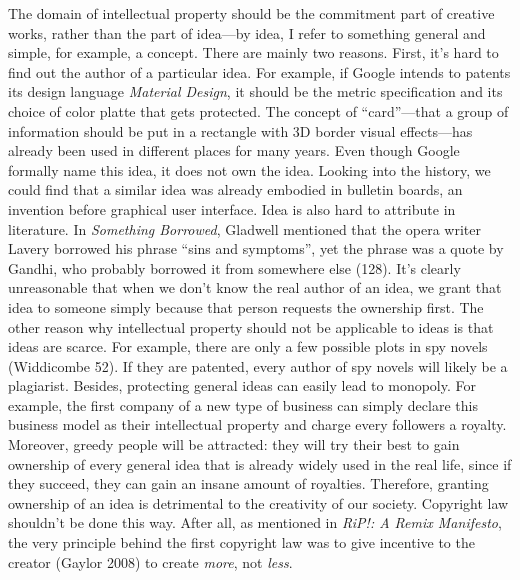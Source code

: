 \documentclass{writing}
\begin{document}
The domain of intellectual property should be the commitment part of
creative works, rather than the part of idea---by idea, I refer to
something general and simple, for example, a concept. There are mainly
two reasons. First, it's hard to find out the author of a particular
idea. For example, if Google intends to patents its design language
\emph{Material Design}, it should be the metric specification and its
choice of color platte that gets protected. The concept of
``card''---that a group of information should be put in a rectangle with
3D border visual effects---has already been used in different places for
many years. Even though Google formally name this idea, it does not own
the idea. Looking into the history, we could find that a similar idea
was already embodied in bulletin boards, an invention before graphical
user interface. Idea is also hard to attribute in literature. In
\emph{Something Borrowed}, Gladwell mentioned that the opera writer
Lavery borrowed his phrase ``sins and symptoms'', yet the phrase was a
quote by Gandhi, who probably borrowed it from somewhere else (128).
It's clearly unreasonable that when we don't know the real author of an
idea, we grant that idea to someone simply because that person requests
the ownership first. The other reason why intellectual property should
not be applicable to ideas is that ideas are scarce. For example, there
are only a few possible plots in spy novels (Widdicombe 52). If they are
patented, every author of spy novels will likely be a plagiarist.
Besides, protecting general ideas can easily lead to monopoly. For
example, the first company of a new type of business can simply declare
this business model as their intellectual property and charge every
followers a royalty. Moreover, greedy people will be attracted: they
will try their best to gain ownership of every general idea that is
already widely used in the real life, since if they succeed, they can
gain an insane amount of royalties. Therefore, granting ownership of an
idea is detrimental to the creativity of our society. Copyright law
shouldn't be done this way. After all, as mentioned in \emph{RiP!: A
Remix Manifesto}, the very principle behind the first copyright law was
to give incentive to the creator (Gaylor 2008) to create \emph{more},
not \emph{less}.
\end{document}
